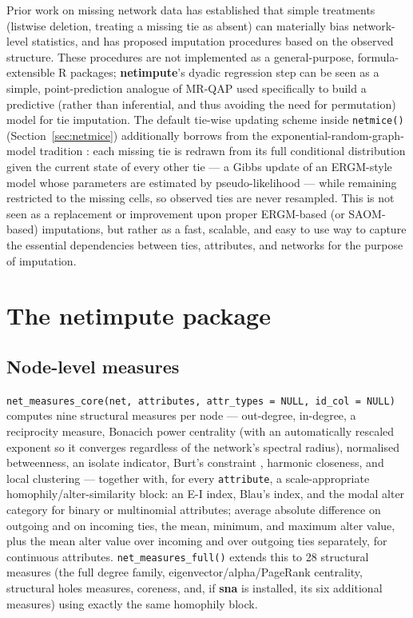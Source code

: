 \documentclass[11pt,a4paper]{article}
\newcommand{\pkg}[1]{\textbf{#1}}
\newcommand{\code}[1]{\texttt{#1}}
\newcommand{\proglang}[1]{\textsf{#1}}
\begin{document}
Prior work on missing network data \citep{Huisman2009,Krause2020} has
established that simple treatments (listwise deletion, treating a missing
tie as absent) can materially bias network-level statistics, and has
proposed imputation procedures based on the observed structure. These
procedures are
not implemented as a general-purpose, formula-extensible \proglang{R}
packages; \pkg{netimpute}'s dyadic regression step can be seen as a simple, point-prediction analogue of MR-QAP
\citep{Krackhardt1988} used specifically to build a predictive (rather than
inferential, and thus avoiding the need for permutation) model for tie imputation. The default tie-wise updating scheme
inside \code{netmice()} (Section~\ref{sec:netmice}) additionally borrows
from the exponential-random-graph-model tradition \citep{Robins2007}: each
missing tie is redrawn from its full conditional distribution given the
current state of every other tie --- a Gibbs update of an ERGM-style model
whose parameters are estimated by pseudo-likelihood --- while remaining
restricted to the missing cells, so observed ties are never resampled. This is not seen as a replacement or improvement upon proper ERGM-based (or SAOM-based) imputations, but rather as a fast, scalable, and easy to use way to capture the essential dependencies between ties, attributes, and networks for the purpose of imputation.

\section{The \pkg{netimpute} package}
\label{sec:package}

\subsection{Node-level measures}
\label{sec:measures}

\code{net\_measures\_core(net, attributes, attr\_types = NULL, id\_col =
NULL)} computes nine structural measures per node --- out-degree,
in-degree, a reciprocity measure, Bonacich power centrality (with an
automatically rescaled exponent so it converges regardless of the network's
spectral radius), normalised betweenness, an isolate indicator, Burt's
constraint \citep{Burt1992}, harmonic closeness, and local clustering ---
together with, for every \code{attribute}, a
scale-appropriate homophily/alter-similarity block: an E-I index, Blau's
index, and the modal alter category for binary or multinomial attributes;
average absolute difference on outgoing and on incoming ties, the
mean, minimum, and maximum alter value, plus the mean alter value over
incoming and over outgoing ties separately, for continuous attributes.
\code{net\_measures\_full()} extends this to 28 structural measures
(the full degree family, eigenvector/alpha/PageRank centrality, structural
holes measures, coreness, and, if \pkg{sna} is installed, its six
additional measures) using exactly the same homophily block.
\end{document}
